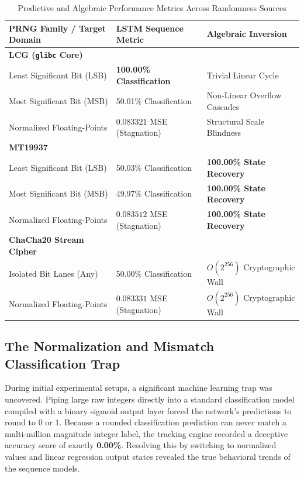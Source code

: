 \documentclass[twocolumn,10pt]{article}
\begin{document}
\begin{table}[h]
\centering
\caption{\label{tab:master_results}Predictive and Algebraic Performance Metrics Across Randomness Sources}
\begin{tabular}{lll}
\toprule
\textbf{PRNG Family / Target Domain} & \textbf{LSTM Sequence Metric} & \textbf{Algebraic Inversion} \\
\midrule
\textbf{LCG (\texttt{glibc} Core)} & & \\
\quad Least Significant Bit (LSB) & \textbf{100.00\% Classification} & Trivial Linear Cycle \\
\quad Most Significant Bit (MSB) & 50.01\% Classification & Non-Linear Overflow Cascades \\
\quad Normalized Floating-Points & $0.083321$ MSE (Stagnation) & Structural Scale Blindness \\
\midrule
\textbf{MT19937} & & \\
\quad Least Significant Bit (LSB) & 50.03\% Classification & \textbf{100.00\% State Recovery} \\
\quad Most Significant Bit (MSB) & 49.97\% Classification & \textbf{100.00\% State Recovery} \\
\quad Normalized Floating-Points & $0.083512$ MSE (Stagnation) & \textbf{100.00\% State Recovery} \\
\midrule
\textbf{ChaCha20 Stream Cipher} & & \\
\quad Isolated Bit Lanes (Any) & 50.00\% Classification & $O(2^{256})$ Cryptographic Wall \\
\quad Normalized Floating-Points & $0.083331$ MSE (Stagnation) & $O(2^{256})$ Cryptographic Wall \\
\bottomrule
\end{tabular}
\end{table}

\subsection{The Normalization and Mismatch Classification Trap}
During initial experimental setups, a significant machine learning trap was uncovered. Piping large raw integers directly into a standard classification model compiled with a binary sigmoid output layer forced the network's predictions to round to $0$ or $1$. Because a rounded classification prediction can never match a multi-million magnitude integer label, the tracking engine recorded a deceptive accuracy score of exactly \textbf{0.00\%}. Resolving this by switching to normalized values and linear regression output states revealed the true behavioral trends of the sequence models.
\end{document}
